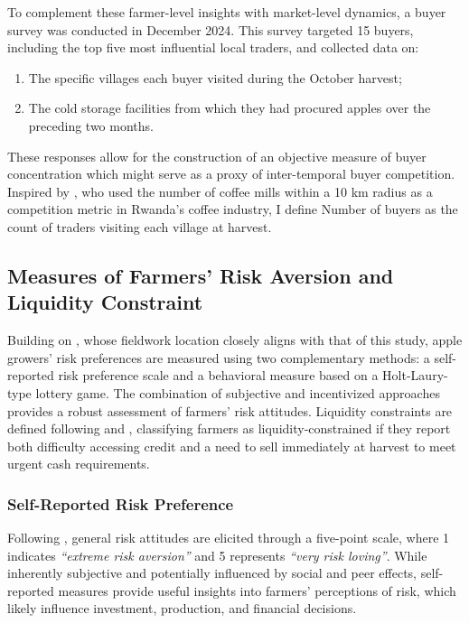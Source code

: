 To complement these farmer-level insights with market-level dynamics, a buyer survey was conducted in December 2024. This survey targeted 15 buyers, including the top five most influential local traders, and collected data on:
\begin{enumerate}
    \item The specific villages each buyer visited during the October harvest;
    \item The cold storage facilities from which they had procured apples over the preceding two months.
\end{enumerate}
These responses allow for the construction of an objective measure of buyer concentration which might serve as a proxy of inter-temporal buyer competition. Inspired by \cite{macchiavello2021competition}, who used the number of coffee mills within a 10 km radius as a competition metric in Rwanda's coffee industry, I define \textsf{Number of buyers} as the count of traders visiting each village at harvest.  


\subsection{Measures of Farmers' Risk Aversion and Liquidity Constraint}
\noindent Building on \cite{jin2024losses}, whose fieldwork location closely aligns with that of this study, apple growers' risk preferences are measured using two complementary methods: a self-reported risk preference scale and a behavioral measure based on a Holt-Laury-type lottery game. The combination of subjective and incentivized approaches provides a robust assessment of farmers' risk attitudes. Liquidity constraints are defined following \cite{albuquerque2024market} and \cite{stephens2011incomplete}, classifying farmers as liquidity-constrained if they report both difficulty accessing credit and a need to sell immediately at harvest to meet urgent cash requirements.

\subsubsection{Self-Reported Risk Preference}  
\noindent Following \cite{dohmen2011individual}, general risk attitudes are elicited through a five-point scale, where 1 indicates \textit{``extreme risk aversion''} and 5 represents \textit{``very risk loving''}. While inherently subjective and potentially influenced by social and peer effects, self-reported measures provide useful insights into farmers' perceptions of risk, which likely influence investment, production, and financial decisions.  


